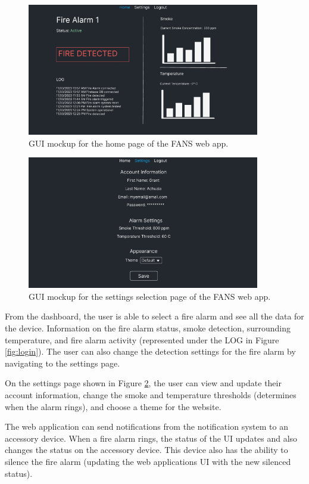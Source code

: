 \begin{figure}[H]
    \centering
    \includegraphics[width=4in]{../assets/gui/HomePage.png}
    \caption{GUI mockup for the home page of the FANS web app.}
    \label{fig:homepage}
\end{figure}

\begin{figure}[H]
    \centering
    \includegraphics[width=4in]{../assets/gui/SettingsPage.png}
    \caption{GUI mockup for the settings selection page of the FANS web app.}
    \label{fig:settings}
\end{figure}

From the dashboard, the user is able to select a fire alarm and see all the data for the device. Information on the
fire alarm status, smoke detection, surrounding temperature, and fire alarm activity (represented under the LOG in
Figure \ref{fig:login}). The user can also change the detection settings for the fire alarm by navigating to the
settings page.

On the settings page shown in Figure \ref{fig:settings}, the user can view and update their account information, change
the smoke and temperature thresholds (determines when the alarm rings), and choose a theme for the website.

The web application can send notifications from the notification system to an accessory device. When a fire alarm
rings, the status of the UI updates and also changes the status on the accessory device. This device also has the
ability to silence the fire alarm (updating the web applications UI with the new silenced status).

